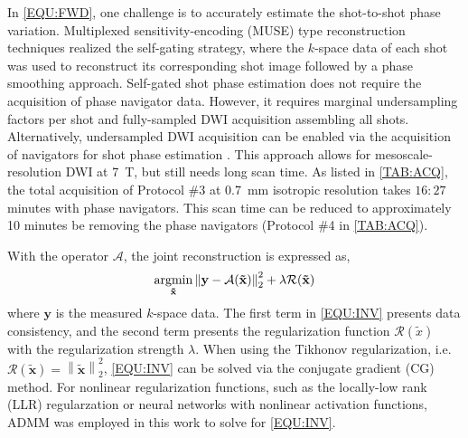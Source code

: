 \documentclass[journal,twoside,web]{ieeecolor}
\newcommand{\argmin}{\operatornamewithlimits{argmin}}
\newcommand{\norm}[1]{\left\lVert#1\right\rVert}
\begin{document}
	In \cref{EQU:FWD}, one challenge is
	to accurately estimate the shot-to-shot phase variation.
	Multiplexed sensitivity-encoding (MUSE) type reconstruction techniques
	\cite{liu_2004_diff_spiral,uecker_2009_nlinv_diff,chen_2013_muse,merrem_2019_nl_steam}
	realized the self-gating strategy,
	where the $k$-space data of each shot was used to reconstruct
	its corresponding shot image followed by a phase smoothing approach.
	Self-gated shot phase estimation does not require
	the acquisition of phase navigator data.
	However, it requires marginal undersampling factors per shot and
	fully-sampled DWI acquisition assembling all shots.
	Alternatively, undersampled DWI acquisition can be enabled
	via the acquisition of navigators for shot phase estimation
	\cite{tan_2024_naviepi}.
	This approach allows for mesoscale-resolution DWI at \SI{7}{\tesla},
	but still needs long scan time.
	As listed in \cref{TAB:ACQ}, the total acquisition of
	Protocol \#3 at \SI{0.7}{mm} isotropic resolution
	takes $16:27$ minutes with phase navigators.
	This scan time can be reduced to approximately 10 minutes
	be removing the phase navigators (Protocol \#4 in \cref{TAB:ACQ}).

	With the operator $\mathcal{A}$, the joint reconstruction is expressed as,
	\begin{equation}
		\argmin_{\mathbf{\tilde{x}}} \norm{\mathbf{y} - \mathcal{A}(\mathbf{\tilde{x}})}_2^2 + \lambda \mathcal{R}(\mathbf{\tilde{x}})
		\label{EQU:INV}
	\end{equation}
	where $\mathbf{y}$ is the measured $k$-space data.
	The first term in \cref{EQU:INV} presents data consistency, and
	the second term presents the regularization function $\mathcal{R}(\tilde{x})$
	with the regularization strength $\lambda$.
	When using the Tikhonov regularization,
	i.e.~$\mathcal{R}(\mathbf{\tilde{x}}) = \norm{\mathbf{\tilde{x}}}_2^2$,
	\cref{EQU:INV} can be solved via the conjugate gradient (CG) method.
	For nonlinear regularization functions,
	such as the locally-low rank (LLR) regularzation \cite{tan_2024_naviepi} or
	neural networks with nonlinear activation functions,
	ADMM was employed in this work to solve for \cref{EQU:INV}.
\end{document}
